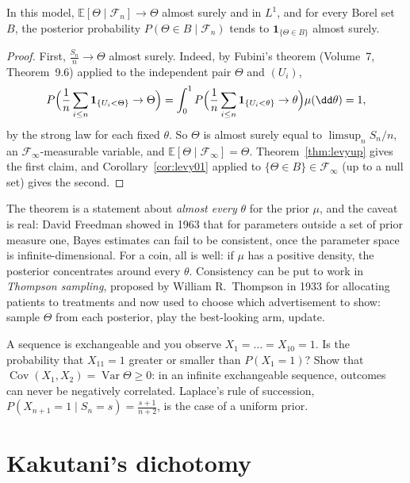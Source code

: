 \begin{theorem}[Doob, 1949]\label{thm:doobconsistency}
In this model, $\mathbb E[\Theta\mid\mathcal F_n]\to\Theta$ almost surely and in $L^1$, and for every Borel set $B$, the posterior probability $P(\Theta\in B\mid\mathcal F_n)$ tends to $\mathbf 1_{\{\Theta\in B\}}$ almost surely.
\end{theorem}
\begin{proof}
First, $\frac{S_n}n\to\Theta$ almost surely. Indeed, by Fubini's theorem (Volume~7, Theorem~9.6) applied to the independent pair $\Theta$ and $(U_i)$,
\[
P\Bigl(\frac1n\sum_{i\le n}\mathbf 1_{\{U_i<\Theta\}}\to\Theta\Bigr)=\int_0^1P\Bigl(\frac1n\sum_{i\le n}\mathbf 1_{\{U_i<\theta\}}\to\theta\Bigr)\mu(\dd\theta)=1,
\]
by the strong law for each fixed $\theta$. So $\Theta$ is almost surely equal to $\limsup_nS_n/n$, an $\mathcal F_\infty$-measurable variable, and $\mathbb E[\Theta\mid\mathcal F_\infty]=\Theta$. Theorem~\ref{thm:levyup} gives
the first claim, and Corollary~\ref{cor:levy01} applied to $\{\Theta\in B\}\in\mathcal F_\infty$ (up to a null set) gives the second.
\end{proof}

The theorem is a statement about \emph{almost every} $\theta$ for the prior $\mu$, and the caveat is real: David Freedman showed in 1963 that for parameters outside a set of prior measure one,
Bayes estimates can fail to be consistent, once the parameter space is infinite-dimensional. For a coin, all is well: if $\mu$ has a positive density, the posterior concentrates around every $\theta$.
Consistency can be put to work in \emph{Thompson sampling}, proposed by William R.\ Thompson in 1933 for allocating patients to treatments and now used to choose which advertisement to
show: sample $\Theta$ from each posterior, play the best-looking arm, update.

\begin{think}
A sequence is exchangeable and you observe $X_1=\dots=X_{10}=1$. Is the probability that $X_{11}=1$ greater or smaller than $P(X_1=1)$? Show that $\operatorname{Cov}(X_1,X_2)=\operatorname{Var}\Theta\ge0$:
in an infinite exchangeable sequence, outcomes can never be negatively correlated. Laplace's rule of succession, $P(X_{n+1}=1\mid S_n=s)=\frac{s+1}{n+2}$, is the case of a uniform prior.
\end{think}

\section{Kakutani's dichotomy}

